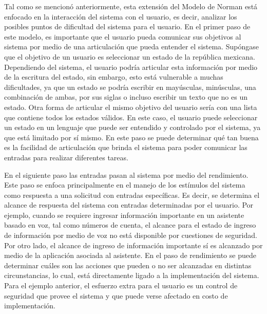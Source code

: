 Tal como se mencionó anteriormente, esta extensión del Modelo de Norman está enfocado en la interacción del sistema con el usuario, es decir, analizar los posibles puntos de dificultad del sistema para el usuario. En el primer paso de este modelo, es importante que el usuario pueda comunicar sus objetivos al sistema por medio de una articulación que pueda entender el sistema. Supóngase que el objetivo de un usuario es seleccionar un estado de la república mexicana. Dependiendo del sistema, el usuario podría articular esta información por medio de la escritura del estado, sin embargo, esto está vulnerable a muchas dificultades, ya que un estado se podría escribir en mayúsculas, minúsculas, una combinación de ambas, por sus siglas o incluso escribir un texto que no es un estado. Otra forma de articular el mismo objetivo del usuario sería con una lista que contiene todos los estados válidos. En este caso, el usuario puede seleccionar un estado en un lenguaje que puede ser entendido y controlado por el sistema, ya que está limitado por sí mismo. En este paso se puede determinar qué tan buena es la facilidad de articulación que brinda el sistema para poder comunicar las entradas para realizar diferentes tareas.

En el siguiente paso las entradas pasan al sistema por medio del rendimiento. Este paso se enfoca principalmente en el manejo de los estímulos del sistema como respuesta a una solicitud con entradas específicas. Es decir, se determina el alcance de respuesta del sistema con entradas determinadas por el usuario. Por ejemplo, cuando se requiere ingresar información importante en un asistente basado en voz, tal como números de cuenta, el alcance para el estado de ingreso de información por medio de voz no está disponible por cuestiones de seguridad. Por otro lado, el alcance de ingreso de información importante sí es alcanzado por medio de la aplicación asociada al asistente. En el paso de rendimiento se puede determinar cuáles son las acciones que pueden o no ser alcanzadas en distintas circunstancias, lo cual, está directamente ligado a la implementación del sistema. Para el ejemplo anterior, el esfuerzo extra para el usuario es un control de seguridad que provee el sistema y que puede verse afectado en costo de implementación.

